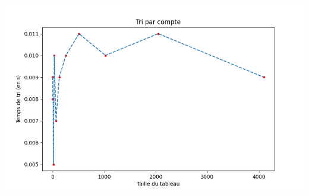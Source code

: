 \documentclass[11pt,a4paper]{article}
\begin{document}
    \includegraphics[scale = 0.7]{../Courbes/Valeurs_triées_sans_répétitions/Tri par compte.png}
    
\end{document}
